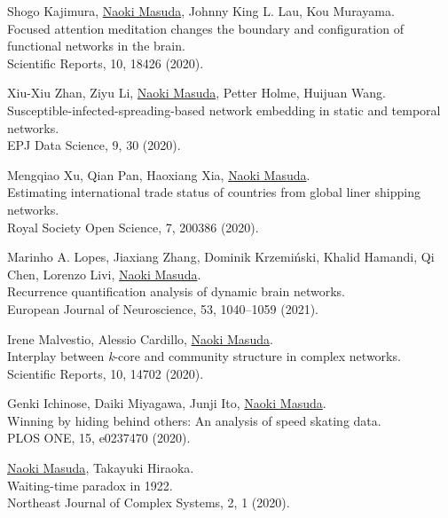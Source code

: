 \documentclass[11pt,letter]{article}
\begin{document}
\begin{etaremune}
\item Shogo Kajimura, \underline{Naoki Masuda}, Johnny King L. Lau, Kou Murayama.\\
Focused attention meditation changes the boundary and configuration of functional networks in the brain.\\
Scientific Reports, 10, 18426 (2020).

\item Xiu-Xiu Zhan, Ziyu Li, \underline{Naoki Masuda}, Petter Holme, Huijuan Wang.\\
Susceptible-infected-spreading-based network embedding in static and temporal networks.\\
EPJ Data Science, 9, 30 (2020).

\item Mengqiao Xu, Qian Pan, Haoxiang Xia, \underline{Naoki Masuda}.\\
Estimating international trade status of countries from global liner shipping networks.\\
Royal Society Open Science, 7, 200386 (2020).

\item Marinho A. Lopes, Jiaxiang Zhang, Dominik Krzemi\'{n}ski, Khalid Hamandi, Qi Chen, Lorenzo Livi, \underline{Naoki Masuda}.\\
Recurrence quantification analysis of dynamic brain networks.\\
European Journal of Neuroscience, 53, 1040--1059 (2021).

\item Irene Malvestio, Alessio Cardillo, \underline{Naoki Masuda}.\\
Interplay between \textit{k}-core and community structure in complex networks.\\
Scientific Reports, 10, 14702 (2020).

\item Genki Ichinose, Daiki Miyagawa, Junji Ito, \underline{Naoki Masuda}.\\
Winning by hiding behind others: An analysis of speed skating data.\\
PLOS ONE, 15, e0237470 (2020).

\item \underline{Naoki Masuda}, Takayuki Hiraoka.\\
Waiting-time paradox in 1922.\\
Northeast Journal of Complex Systems, 2, 1 (2020).


\end{etaremune}
\end{document}
